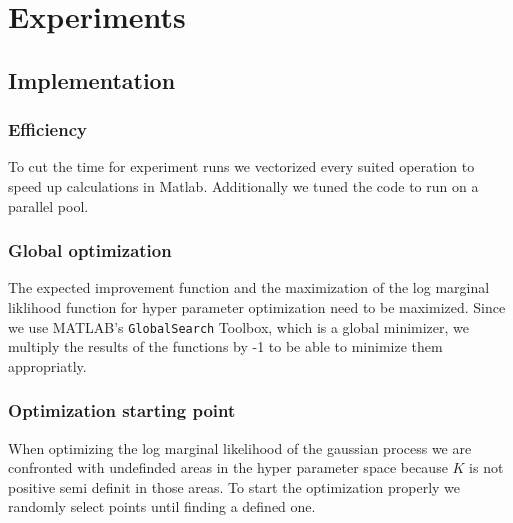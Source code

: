 \chapter{Experiments}
\label{chap:4}

\section{Implementation}

\subsection{Efficiency}
To cut the time for experiment runs we vectorized every suited operation to speed up calculations in Matlab. Additionally we tuned the code to run on a parallel pool.\\

\subsection{Global optimization}
The expected improvement function and the maximization of the log marginal liklihood function for hyper parameter optimization need to be maximized. Since we use MATLAB's \texttt{GlobalSearch} Toolbox, which is a global minimizer, we multiply the results of the functions by -1 to be able to minimize them appropriatly.
\\

\subsection{Optimization starting point}
When optimizing the log marginal likelihood of the gaussian process we are confronted with undefinded areas in the hyper parameter space because $K$ is not positive semi definit in those areas. To start the optimization properly we randomly select points until finding a defined one.

